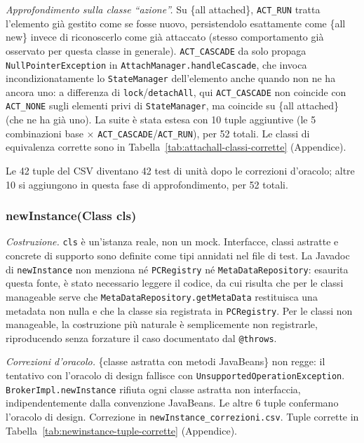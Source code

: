 \textit{Approfondimento sulla classe ``azione''.} Su \{all attached\}, \texttt{ACT\_RUN} tratta
l'elemento già gestito come se fosse nuovo, persistendolo esattamente come \{all new\} invece di
riconoscerlo come già attaccato (stesso comportamento già osservato per questa classe in
generale). \texttt{ACT\_CASCADE} da solo propaga \texttt{NullPointerException} in
\texttt{AttachManager.handleCascade}, che invoca incondizionatamente lo \texttt{StateManager}
dell'elemento anche quando non ne ha ancora uno: a differenza di \texttt{lock}/\texttt{detachAll},
qui \texttt{ACT\_CASCADE} non coincide con \texttt{ACT\_NONE} sugli elementi privi di
\texttt{StateManager}, ma coincide su \{all attached\} (che ne ha già uno). La suite è stata
estesa con 10 tuple aggiuntive (le 5 combinazioni base $\times$
\texttt{ACT\_CASCADE}/\texttt{ACT\_RUN}), per 52 totali. Le classi di equivalenza corrette sono
in Tabella~\ref{tab:attachall-classi-corrette} (Appendice).

Le 42 tuple del CSV diventano 42 test di unità dopo le correzioni d'oracolo; altre 10 si
aggiungono in questa fase di approfondimento, per 52 totali.

\subsubsection{newInstance(Class cls)}

\textit{Costruzione.} \texttt{cls} è un'istanza reale, non un mock. Interfacce, classi
astratte e concrete di supporto sono definite come tipi annidati nel file di test. La Javadoc di
\texttt{newInstance} non menziona né \texttt{PCRegistry} né \texttt{MetaDataRepository}: esaurita
questa fonte, è stato necessario leggere il codice, da cui risulta che per le classi manageable
serve che \texttt{MetaDataRepository.getMetaData} restituisca una metadata non nulla e che la
classe sia registrata in \texttt{PCRegistry}. Per le classi non manageable, la costruzione più
naturale è semplicemente non registrarle, riproducendo senza forzature il caso documentato dal
\texttt{@throws}.

\textit{Correzioni d'oracolo.} \{classe astratta con metodi JavaBeans\} non regge: il tentativo
con l'oracolo di design fallisce con \texttt{UnsupportedOperationException}.
\texttt{BrokerImpl.newInstance} rifiuta ogni classe astratta non interfaccia, indipendentemente
dalla convenzione JavaBeans. Le
altre 6 tuple confermano l'oracolo di design. Correzione in
\texttt{newInstance\_correzioni.csv}. Tuple corrette in
Tabella~\ref{tab:newinstance-tuple-corrette} (Appendice).

